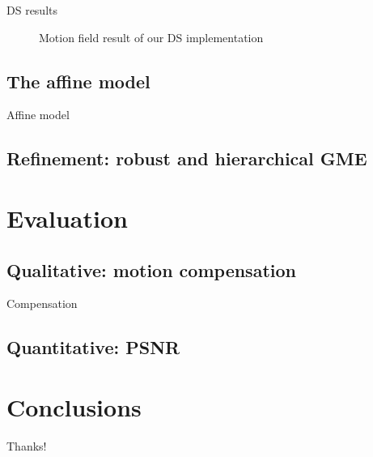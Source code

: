 \documentclass[aspectratio=1610,xcolor=dvipsnames]{beamer}
\begin{document}
\begin{frame}{DS results}
\begin{figure}[H]
\begin{minipage}[b]{0.45\textwidth}
            \label{fig:bbme-3-res}
		\end{minipage}
        \label{fig:bbme-3}
        \caption{Motion field result of our DS implementation}
	\end{figure}
\end{frame}

\subsection{The affine model}
\begin{frame}{Affine model}
    
\end{frame}

\subsection{Refinement: robust and hierarchical GME}


\section{Evaluation}
\subsection{Qualitative: motion compensation}
\begin{frame}{Compensation}

\end{frame}
\subsection{Quantitative: PSNR}

\section{Conclusions}

\begin{frame}
    \begin{center}
        {\Huge\calligra Thanks!}
    \end{center}
\end{frame}
\end{document}
